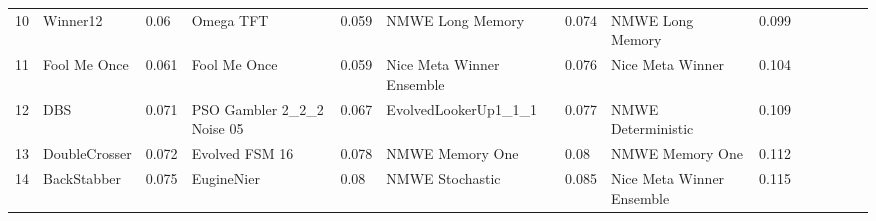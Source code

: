 \begin{tabular}{lggllggllggllr}
    10 &                 Winner12 &      0.06 &                   Omega TFT &     0.059 &           NMWE Long Memory &     0.074 &           NMWE Long Memory &     0.099 \\
    11 &             Fool Me Once &     0.061 &                Fool Me Once &     0.059 &  Nice Meta Winner Ensemble &     0.076 &           Nice Meta Winner &     0.104 \\
    12 &                      DBS &     0.071 &  PSO Gambler 2\_2\_2 Noise 05 &     0.067 &       EvolvedLookerUp1\_1\_1 &     0.077 &         NMWE Deterministic &     0.109 \\
    13 &            DoubleCrosser &     0.072 &              Evolved FSM 16 &     0.078 &            NMWE Memory One &      0.08 &            NMWE Memory One &     0.112 \\
    14 &              BackStabber &     0.075 &                  EugineNier &      0.08 &            NMWE Stochastic &     0.085 &  Nice Meta Winner Ensemble &     0.115 \\
    \bottomrule
    \end{tabular}
    